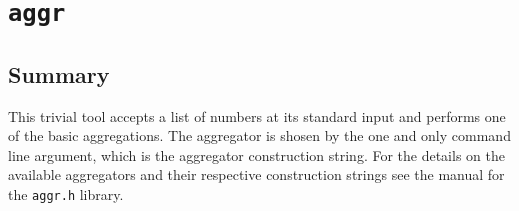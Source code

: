 
\section{\texttt{aggr}}

	\subsection{Summary}
	This trivial tool accepts a list of numbers at its standard input and performs 
	one of the basic aggregations. The aggregator is shosen by the one and only
	command line argument, which is the aggregator construction string. For the
	details on the available aggregators and their respective construction strings
	see the manual for the \texttt{aggr.h} library.

